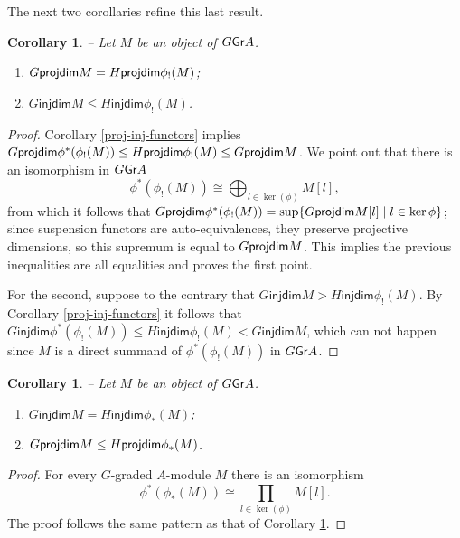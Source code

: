 \documentclass[twoside,11pt]{article}
\newcommand{\GrMod}{{\sf Gr}}
\newcommand{\pd}{{\sf projdim}}
\newcommand{\injdim}{\mathsf{injdim}}
\newtheorem{subcorollary}[subtheorem]{Corollary}
\begin{document}
The next two corollaries refine this last result.
\begin{subcorollary} -- \label{dim-and-!}
Let $M$ be an object of $G\GrMod A$.
\begin{enumerate}
\item $G\pd M = H\pd \phi_!(M)$; 
\item $G\injdim M  \le H\injdim \phi_!(M)$.
\end{enumerate}
\end{subcorollary}

\begin{proof} 
Corollary \ref{proj-inj-functors} implies $G\pd \phi^*(\phi_!(M)) \leq H \pd \phi_!(M)
\leq G\pd M$. We point out that there is an isomorphism in $G\GrMod A$
\[
  \phi^*(\phi_!(M)) \cong \bigoplus_{l\in\ker(\phi)} M[l], 
\]
from which it follows that $G\pd \phi^*(\phi_!(M)) = \sup \{G\pd M[l] \mid l \in \ker
\phi\}$; since suspension functors are auto-equivalences, they preserve projective
dimensions, so this supremum is equal to $G\pd M$. This implies the previous inequalities
are all equalities and proves the first point.

For the second, suppose to the contrary that $G\injdim M > H\injdim \phi_!(M)$. By
Corollary \ref{proj-inj-functors} it follows that $G\injdim \phi^*(\phi_!(M)) \le H\injdim
\phi_!(M) < G\injdim M$, which can not happen since $M$ is a direct summand of
$\phi^*(\phi_!(M))$ in $G\GrMod A$. 
\end{proof}

\begin{subcorollary} -- \label{dim-and-*} 
Let $M$ be an object of $G\GrMod A$. 
\begin{enumerate}
\item $G\injdim M  = H\injdim \phi_*(M)$;
\item $G\pd M \le H\pd\phi_*(M)$.
\end{enumerate}
\end{subcorollary}
\begin{proof}
For every $G$-graded $A$-module $M$ there is an isomorphism 
\[
\phi^*(\phi_* (M)) \cong \prod_{l\in\ker(\phi)} M[l].
\]
The proof follows the same pattern as that of Corollary \ref{dim-and-!}.
\end{proof}
\end{document}
